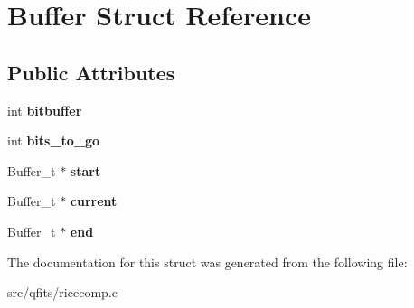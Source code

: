 \hypertarget{struct_buffer}{}\section{Buffer Struct Reference}
\label{struct_buffer}
\subsection*{Public Attributes}
\begin{DoxyCompactItemize}
\item 
\mbox{\label{struct_buffer_ac1d7739ac4b02bf89f715f1c21901d74}} 
int {\bfseries bitbuffer}
\item 
\mbox{\label{struct_buffer_a475877f4d785f2cb869a18c30a55f3a5}} 
int {\bfseries bits\+\_\+to\+\_\+go}
\item 
\mbox{\label{struct_buffer_ad28f971cdef929a75c7ef21b483f3df6}} 
Buffer\+\_\+t $\ast$ {\bfseries start}
\item 
\mbox{\label{struct_buffer_a0cfb417b3977c8cf71c9d91ef2a4edb8}} 
Buffer\+\_\+t $\ast$ {\bfseries current}
\item 
\mbox{\label{struct_buffer_a6358916c6099524c5376ac94ae99f9ab}} 
Buffer\+\_\+t $\ast$ {\bfseries end}
\end{DoxyCompactItemize}


The documentation for this struct was generated from the following file\+:\begin{DoxyCompactItemize}
\item 
src/qfits/ricecomp.\+c\end{DoxyCompactItemize}
